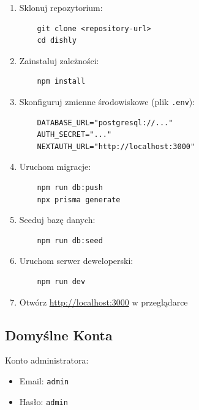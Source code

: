 \documentclass[12pt,a4paper,utf-8]{article}
\begin{document}
\begin{enumerate}
    \item Sklonuj repozytorium:
    \begin{verbatim}
    git clone <repository-url>
    cd dishly
    \end{verbatim}
    
    \item Zainstaluj zależności:
    \begin{verbatim}
    npm install
    \end{verbatim}
    
    \item Skonfiguruj zmienne środowiskowe (plik \texttt{.env}):
    \begin{verbatim}
    DATABASE_URL="postgresql://..."
    AUTH_SECRET="..."
    NEXTAUTH_URL="http://localhost:3000"
    \end{verbatim}
    
    \item Uruchom migracje:
    \begin{verbatim}
    npm run db:push
    npx prisma generate
    \end{verbatim}
    
    \item Seeduj bazę danych:
    \begin{verbatim}
    npm run db:seed
    \end{verbatim}
    
    \item Uruchom serwer deweloperski:
    \begin{verbatim}
    npm run dev
    \end{verbatim}
    
    \item Otwórz \href{http://localhost:3000}{http://localhost:3000} w przeglądarce
\end{enumerate}

\subsection{Domyślne Konta}

Konto administratora:
\begin{itemize}
    \item Email: \texttt{admin}
    \item Hasło: \texttt{admin}
\end{itemize}

\newpage
\end{document}
